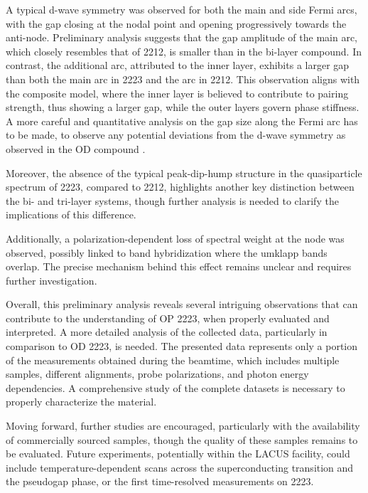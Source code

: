 A typical d-wave symmetry was observed for both the main and side Fermi arcs, with the gap closing at the nodal point and opening progressively towards the anti-node.
Preliminary analysis suggests that the gap amplitude of the main arc, which closely resembles that of 2212, is smaller than in the bi-layer compound.
In contrast, the additional arc, attributed to the inner  layer, exhibits a larger gap than both the main arc in 2223 and the arc in 2212.
This observation aligns with the composite model, where the inner layer is believed to contribute to pairing strength, thus showing a larger gap, while the outer layers govern phase stiffness.
A more careful and quantitative analysis on the gap size along the Fermi arc has to be made, to observe any potential deviations from the d-wave symmetry as observed in the OD compound \cite{luo_electronic_2023}.

Moreover, the absence of the typical peak-dip-hump structure in the quasiparticle spectrum of 2223, compared to 2212, highlights another key distinction between the bi- and tri-layer systems, though further analysis is needed to clarify the implications of this difference.

Additionally, a polarization-dependent loss of spectral weight at the node was observed, possibly linked to band hybridization where the umklapp bands overlap.
The precise mechanism behind this effect remains unclear and requires further investigation.

Overall, this preliminary analysis reveals several intriguing observations that can contribute to the understanding of OP 2223, when properly evaluated and interpreted.
A more detailed analysis of the collected data, particularly in comparison to OD 2223, is needed.
The presented data represents only a portion of the measurements obtained during the beamtime, which includes multiple samples, different alignments, probe polarizations, and photon energy dependencies.
A comprehensive study of the complete datasets is necessary to properly characterize the material.

Moving forward, further studies are encouraged, particularly with the availability of commercially sourced samples, though the quality of these samples remains to be evaluated.
Future experiments, potentially within the LACUS facility, could include temperature-dependent scans across the superconducting transition and the pseudogap phase, or the first time-resolved measurements on 2223.